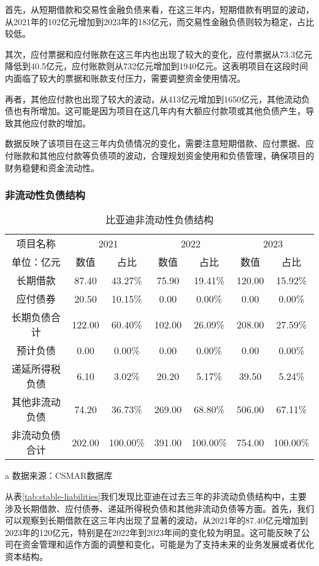 首先，从短期借款和交易性金融负债来看，在这三年内，短期借款有明显的波动，从2021年的102亿元增加到2023年的183亿元，而交易性金融负债则较为稳定，占比较低。

其次，应付票据和应付账款在这三年内也出现了较大的变化，应付票据从73.3亿元降低到40.5亿元，应付账款则从732亿元增加到1940亿元。这表明项目在这段时间内面临了较大的票据和账款支付压力，需要调整资金使用情况。

再者，其他应付款也出现了较大的波动，从413亿元增加到1650亿元，其他流动负债也有所增加。这可能是因为项目在这几年内有大额应付款项或其他负债产生，导致其他应付款的增加。

数据反映了该项目在这三年内负债情况的变化，需要注意短期借款、应付票据、应付账款和其他应付款等负债项的波动，合理规划资金使用和负债管理，确保项目的财务稳健和资金流动性。
\subsubsection{非流动性负债结构}
\begin{table}
  \centering
  \begin{threeparttable}[c]
    \caption{比亚迪非流动性负债结构}
    \label{tab:stable-liabilities}
    \begin{tabular}{ccccccc}
      \toprule
      项目名称 & \multicolumn{2}{c}{2021} & \multicolumn{2}{c}{2022} & \multicolumn{2}{c}{2023} \\
        单位：亿元 & 数值 & 占比 & 数值 & 占比 & 数值 & 占比 \\
      \midrule
        长期借款 & 87.40  & 43.27\% & 75.90  & 19.41\% & 120.00  & 15.92\% \\
        应付债券 & 20.50  & 10.15\% & 0.00  & 0.00\% & 0.00  & 0.00\% \\
        长期负债合计 & 122.00  & 60.40\% & 102.00  & 26.09\% & 208.00  & 27.59\% \\
        预计负债 & 0.00  & 0.00\% & 0.00  & 0.00\% & 0.00  & 0.00\% \\
        递延所得税负债 & 6.10  & 3.02\% & 20.20  & 5.17\% & 39.50  & 5.24\% \\
        其他非流动负债 & 74.20  & 36.73\% & 269.00  & 68.80\% & 506.00  & 67.11\% \\
        非流动负债合计 & 202.00  & 100.00\% & 391.00  & 100.00\% & 754.00  & 100.00\% \\
      \bottomrule
    \end{tabular}
    \begin{tablenotes}
      \item [a] 数据来源：CSMAR数据库
    \end{tablenotes}
  \end{threeparttable}
\end{table}
从表\eqref{tab:stable-liabilities}我们发现比亚迪在过去三年的非流动负债结构中，主要涉及长期借款、应付债券、递延所得税负债和其他非流动负债等方面。首先，我们可以观察到长期借款在这三年内出现了显著的波动，从2021年的87.40亿元增加到2023年的120亿元，特别是在2022年到2023年间的变化较为明显。这可能反映了公司在资金管理和运作方面的调整和变化，可能是为了支持未来的业务发展或者优化资本结构。

